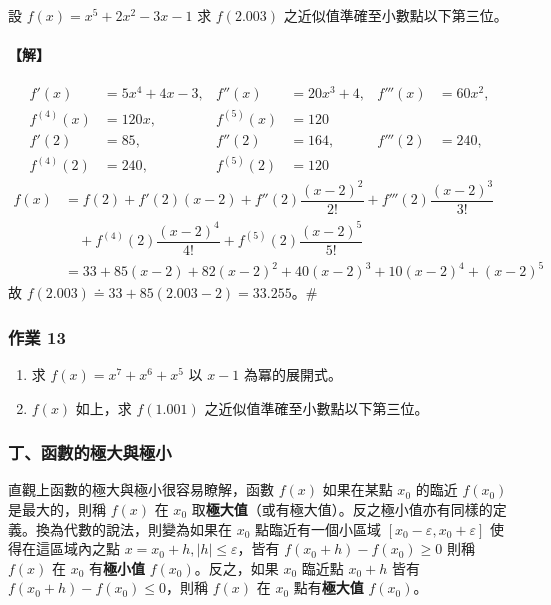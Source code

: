 \begin{example}\label{ex:b6-2-21}
設 $f(x)=x^5+2x^2-3x-1$ 求 $f(2.003)$ 之近似值準確至小數點以下第三位。
\end{example}

\paragraph{【解】}
\begin{align*}
f'(x) &= 5x^4+4x-3, & f''(x) &= 20x^3+4, & f'''(x) &= 60x^2, \\
f^{(4)}(x) &= 120x, & f^{(5)}(x) &= 120 \\
f'(2) &= 85, & f''(2) &= 164, & f'''(2) &= 240, \\
f^{(4)}(2) &= 240, & f^{(5)}(2) &= 120
\end{align*}
\begin{align*}
f(x) &= f(2) + f'(2)(x-2) + f''(2)\dfrac{(x-2)^2}{2!} + f'''(2)\dfrac{(x-2)^3}{3!} \\
&\quad + f^{(4)}(2)\dfrac{(x-2)^4}{4!} + f^{(5)}(2)\dfrac{(x-2)^5}{5!} \\
&= 33 + 85(x-2) + 82(x-2)^2 + 40(x-2)^3 + 10(x-2)^4 + (x-2)^5
\end{align*}
故 $f(2.003) \doteq 33 + 85(2.003-2) = 33.255$。\hfill$\#$

\subsubsection*{作業 13}\label{hw:b6-2-13}
\begin{enumerate}[label=(\roman*), leftmargin=2em]
  \item 求 $f(x)=x^7+x^6+x^5$ 以 $x-1$ 為冪的展開式。
  \item $f(x)$ 如上，求 $f(1.001)$ 之近似值準確至小數點以下第三位。
\end{enumerate}

\subsubsection*{丁、函數的極大與極小}\label{subsec:b6-2-4-d}

直觀上函數的極大與極小很容易瞭解，函數 $f(x)$ 如果在某點 $x_0$ 的臨近 $f(x_0)$ 是最大的，則稱 $f(x)$ 在 $x_0$ 取\textbf{極大值}（或有極大值）。反之極小值亦有同樣的定義。換為代數的說法，則變為如果在 $x_0$ 點臨近有一個小區域 $[x_0-\varepsilon, x_0+\varepsilon]$ 使得在這區域內之點 $x=x_0+h, |h| \le \varepsilon$，皆有 $f(x_0+h)-f(x_0) \ge 0$ 則稱 $f(x)$ 在 $x_0$ 有\textbf{極小值} $f(x_0)$。反之，如果 $x_0$ 臨近點 $x_0+h$ 皆有 $f(x_0+h)-f(x_0) \le 0$，則稱 $f(x)$ 在 $x_0$ 點有\textbf{極大值} $f(x_0)$。


